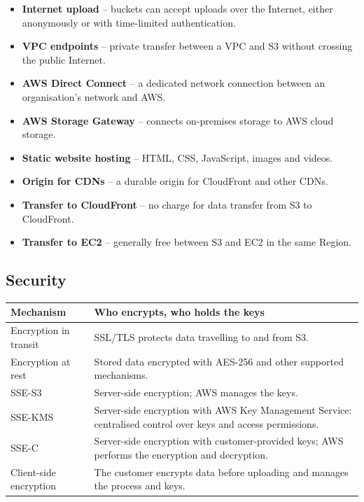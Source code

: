 \documentclass[11pt,a4paper]{article}
\begin{document}


\begin{itemize}\itemsep2pt
  \item \textbf{Internet upload} -- buckets can accept uploads over the Internet, either
        anonymously or with time-limited authentication.
  \item \textbf{VPC endpoints} -- private transfer between a VPC and S3 without crossing the
        public Internet.
  \item \textbf{AWS Direct Connect} -- a dedicated network connection between an
        organisation's network and AWS.
  \item \textbf{AWS Storage Gateway} -- connects on-premises storage to AWS cloud storage.
\end{itemize}


\begin{itemize}\itemsep2pt
  \item \textbf{Static website hosting} -- HTML, CSS, JavaScript, images and videos.
  \item \textbf{Origin for CDNs} -- a durable origin for CloudFront and other CDNs.
  \item \textbf{Transfer to CloudFront} -- no charge for data transfer from S3 to CloudFront.
  \item \textbf{Transfer to EC2} -- generally free between S3 and EC2 in the same Region.
\end{itemize}

\subsection{Security}


\begin{tabularx}{\textwidth}{@{}lX@{}}
\toprule
\rowcolor{tablehead}\textbf{Mechanism} & \textbf{Who encrypts, who holds the keys} \\
\midrule
Encryption in transit & SSL/TLS protects data travelling to and from S3. \\
\addlinespace
Encryption at rest & Stored data encrypted with AES-256 and other supported mechanisms. \\
\addlinespace
SSE-S3 & Server-side encryption; AWS manages the keys. \\
\addlinespace
SSE-KMS & Server-side encryption with AWS Key Management Service: centralised control over
  keys and access permissions. \\
\addlinespace
SSE-C & Server-side encryption with customer-provided keys; AWS performs the encryption and
  decryption. \\
\addlinespace
Client-side encryption & The customer encrypts data before uploading and manages the process
  and keys. \\
\bottomrule
\end{tabularx}
\end{document}
